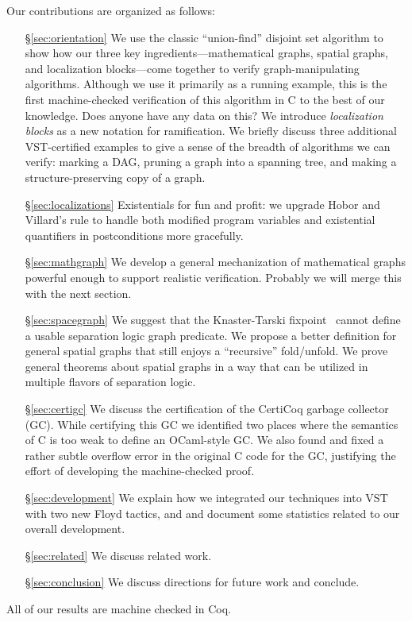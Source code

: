 Our contributions are organized as follows:
\begin{itemize}
\item[\S\ref{sec:orientation}] We use the classic ``union-find'' disjoint set algorithm to show how our three key ingredients---mathematical graphs, spatial graphs, and localization blocks---come together to verify graph-manipulating algorithms.  Although we use it primarily as a running example, this is the first machine-checked verification of this algorithm in C to the best of our knowledge. {\color{blue} Does anyone have any data on this?}  {\color{magenta} We introduce \emph{localization blocks} as a new notation for ramification. We briefly discuss three additional VST-certified examples to give a sense of the breadth of algorithms we can verify: marking a DAG, pruning a graph into a spanning tree, and making a structure-preserving copy of a graph.}
\item[\S\ref{sec:localizations}] {\color{magenta} Existentials for fun and profit: we upgrade Hobor and Villard's  rule to handle both modified program variables and existential quantifiers in postconditions more gracefully.}
\item[\S\ref{sec:mathgraph}] We develop a general mechanization of mathematical graphs powerful enough to support realistic verification. {\color{magenta}Probably we will merge this with the next section.} %
\item[\S\ref{sec:spacegraph}] We suggest that the Knaster-Tarski fixpoint~\cite{tarski:fixpoint} cannot define a usable separation logic graph predicate.  We propose a better definition for general spatial graphs that still enjoys a ``recursive'' fold/unfold.  We prove general theorems about spatial graphs in a way that can be utilized in multiple flavors of separation logic. %
\item[\S\ref{sec:certigc}] We discuss the certification of the CertiCoq garbage collector (GC). While certifying this GC we identified two places where the semantics of C is too weak to define an OCaml-style GC. We also found and fixed a rather subtle overflow error in the original C code for the GC, justifying the effort of developing the machine-checked proof.
\item[\S\ref{sec:development}] We explain how we integrated our techniques into VST with two new Floyd tactics,  and  and document some statistics related to our overall development.
\item[\S\ref{sec:related}] We discuss related work.
\item[\S\ref{sec:conclusion}] We discuss directions for future work and conclude.
\end{itemize}
All of our results are machine checked in Coq.


